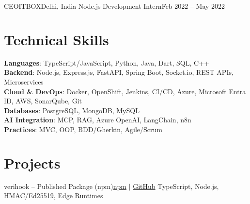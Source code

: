 \documentclass[a4paper,10pt]{article}
\begin{document}
    \resumeSubheading
      {CEOITBOX}{Delhi, India}
      {Node.js Development Intern}{Feb 2022 -- May 2022}
      \resumeItemListStart
      \resumeItemListEnd

  \resumeSubHeadingListEnd

\section{Technical Skills}
 \begin{itemize}[leftmargin=0.15in, label={}]
    \small{\item{
     \textbf{Languages}{: TypeScript/JavaScript, Python, Java, Dart, SQL, C++} \\
     \textbf{Backend}{: Node.js, Express.js, FastAPI, Spring Boot, Socket.io, REST APIs, Microservices} \\
     \textbf{Cloud \& DevOps}{: Docker, OpenShift, Jenkins, CI/CD, Azure, Microsoft Entra ID, AWS, SonarQube, Git} \\
     \textbf{Databases}{: PostgreSQL, MongoDB, MySQL} \\
     \textbf{AI Integration}{: MCP, RAG, Azure OpenAI, LangChain, n8n} \\
     \textbf{Practices}{: MVC, OOP, BDD/Gherkin, Agile/Scrum}
    }}
 \end{itemize}

\section{Projects}
  \resumeSubHeadingListStart

    \resumeSubheading
      {verihook -- Published Package (npm)}{\href{https://www.npmjs.com/package/verihook}{npm} $|$ \href{https://github.com/creatorpiyush/verihook}{GitHub}}
      {TypeScript, Node.js, HMAC/Ed25519, Edge Runtimes}{}
      \resumeItemListStart
      \resumeItemListEnd
\end{document}
